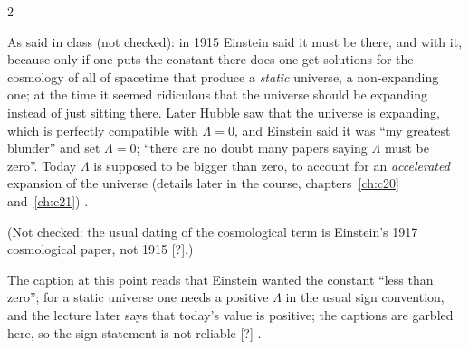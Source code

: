 \begin{paracol}{2}
\begin{aside}
As said in class (not checked): in 1915 Einstein said it must be there, and with it, because only if one puts the constant there does one get solutions for the cosmology of all of spacetime that produce a \emph{static} universe, a non-expanding one; at the time it seemed ridiculous that the universe should be expanding instead of just sitting there. Later Hubble saw that the universe is expanding, which is perfectly compatible with $\Lambda=0$, and Einstein said it was ``my greatest blunder'' and set $\Lambda=0$; ``there are no doubt many papers saying $\Lambda$ must be zero''. Today $\Lambda$ is supposed to be bigger than zero, to account for an \emph{accelerated} expansion of the universe (details later in the course, chapters~\ref{ch:c20} and~\ref{ch:c21}) .

(Not checked: the usual dating of the cosmological term is Einstein's 1917 cosmological paper, not 1915 [?].)
\end{aside}
\begin{coursenote}
The caption at this point reads that Einstein wanted the constant ``less than zero''; for a static universe one needs a positive $\Lambda$ in the usual sign convention, and the lecture later says that today's value is positive; the captions are garbled here, so the sign statement is not reliable [?] .
\end{coursenote}


\end{paracol}

